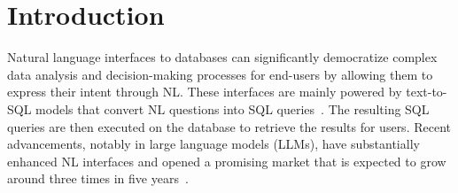\section{Introduction}

Natural language interfaces to databases can significantly democratize complex data analysis and decision-making processes for end-users by allowing them to express their intent through NL.
These interfaces are mainly powered by text-to-SQL models that convert NL questions into SQL queries~\cite{smbop, picard, dinsql}. The resulting SQL queries are then executed on the database to retrieve the results for users.
Recent advancements, notably in large language models (LLMs), have substantially enhanced NL interfaces and opened a promising market that is expected to grow around three times in five years~\cite{market1, market2, market3}.



